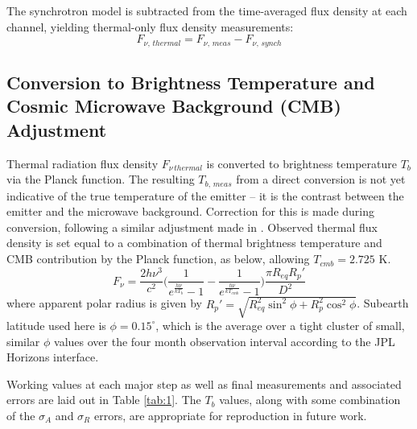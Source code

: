\documentclass{article}
\newcommand{\expon}[1]{e^{#1}}
\begin{document}
	The synchrotron model is subtracted from the time-averaged flux density at each channel, yielding thermal-only flux density measurements:
	$$F_{\nu,\,thermal} = F_{\nu,\,meas} - F_{\nu,\,synch}$$


\subsection{Conversion to Brightness Temperature and Cosmic Microwave Background (CMB) Adjustment} %
	
	Thermal radiation flux density $F_{\nu\,thermal}$ is converted to brightness temperature $T_b$ via the Planck function.
	The resulting $T_{b,\,meas}$ from a direct conversion is not yet indicative of the true temperature of the emitter -- it is the contrast between the emitter and the microwave background.
	Correction for this is made during conversion, following a similar adjustment made in \citealt{2014Icar..237..211D}.
	Observed thermal flux density is set equal to a combination of thermal brightness temperature and CMB contribution by the Planck function, as below, allowing $T_{cmb} = 2.725$ K.
	$$ F_{\nu} = \frac{2h\nu^3}{c^2}\Bigg( \frac{1}{\expon{\frac{h\nu}{kT_b}} - 1} - \frac{1}{\expon{\frac{h\nu}{kT_{cmb}}} - 1} \Bigg)
		\frac{\pi R_{eq} R_{p}'}{D^2} $$
	where apparent polar radius is given by $R_{p}' = \sqrt{R_{eq}^{2}\sin^{2}{\phi} + R_{p}^{2}\cos^{2}{\phi}}$.
	Subearth latitude used here is $\phi = 0.15^{\circ}$, which is the average over a tight cluster of
	small, similar $\phi$ values over the four month observation interval according to the JPL Horizons interface.

	Working values at each major step as well as final measurements and associated errors are laid out in Table \ref{tab:1}.
	The $T_b$ values, along with some combination of the $\sigma_{A}$ and $\sigma_{R}$ errors, are appropriate for reproduction in future work.
\end{document}
